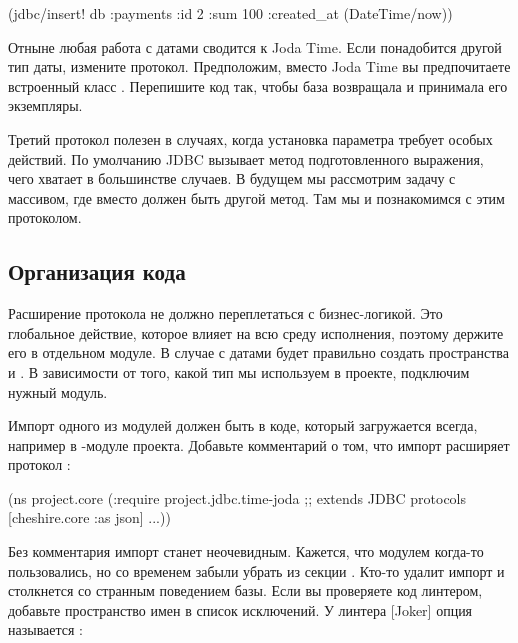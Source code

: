 \begin{english}
  \begin{clojure}
(jdbc/insert!
  db :payments
  {:id 2 :sum 100 :created_at (DateTime/now)})
  \end{clojure}
\end{english}

Отныне любая работа с датами сводится к Joda Time. Если понадобится другой тип даты, измените протокол. Предположим, вместо Joda Time вы предпочитаете встроенный класс . Перепишите код так, чтобы база возвращала и принимала его экземпляры.

Третий протокол  полезен в случаях, когда установка параметра требует особых действий. По умолчанию JDBC вызывает метод  подготовленного выражения, чего хватает в большинстве случаев. В будущем мы рассмотрим задачу с массивом, где вместо  должен быть другой метод. Там мы и познакомимся с этим протоколом.

\subsection{Организация кода}

Расширение протокола не должно переплетаться с бизнес-логикой. Это глобальное действие, которое влияет на всю среду исполнения, поэтому держите его в отдельном модуле. В случае с датами будет правильно создать пространства  и . В зависимости от того, какой тип мы используем в проекте, подключим нужный модуль.

Импорт одного из модулей должен быть в коде, который загружается всегда, например в -модуле проекта. Добавьте комментарий о том, что импорт расширяет протокол :

\begin{english}
  \begin{clojure/lines}
(ns project.core
  (:require
   project.jdbc.time-joda ;; extends JDBC protocols
   [cheshire.core :as json]
   ...))
  \end{clojure/lines}
\end{english}

\def\urljoker{https://github.com/candid82/joker}

Без комментария импорт станет неочевидным. Кажется, что модулем когда-то пользовались, но со временем забыли убрать из секции . Кто-то удалит импорт и столкнется со странным поведением базы. Если вы проверяете код линтером, добавьте пространство имен в список исключений. У линтера \footurl{Joker}{\urljoker}[Joker] опция называется :

